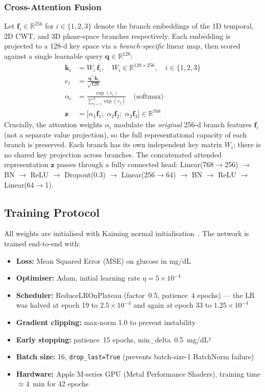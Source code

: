 \documentclass[conference]{IEEEtran}
\begin{document}
\subsubsection{Cross-Attention Fusion}
Let $\mathbf{f}_i \in \mathbb{R}^{256}$ for $i \in \{1,2,3\}$ denote the
branch embeddings of the 1D temporal, 2D CWT, and 3D phase-space branches
respectively.  Each embedding is projected to a 128-d key space via a
\emph{branch-specific} linear map, then scored against a single learnable
query $\mathbf{q} \in \mathbb{R}^{128}$:
\begin{align}
  \mathbf{k}_i &= W_i\, \mathbf{f}_i, \quad
  W_i \in \mathbb{R}^{128\times256}, \quad i \in \{1,2,3\} \label{eq:attn_key}\\
  e_i           &= \frac{\mathbf{q}^\top \mathbf{k}_i}{\sqrt{128}} \\
  \alpha_i       &= \frac{\exp(e_i)}{\sum_{j=1}^{3} \exp(e_j)}\quad\text{(softmax)} \\
  \mathbf{z}    &= \bigl[\alpha_1\mathbf{f}_1;\;
                          \alpha_2\mathbf{f}_2;\;
                          \alpha_3\mathbf{f}_3\bigr] \in \mathbb{R}^{768}
  \label{eq:attn}
\end{align}
Crucially, the attention weights $\alpha_i$ modulate the \emph{original}
256-d branch features $\mathbf{f}_i$ (not a separate value projection),
so the full representational capacity of each branch is preserved.  Each
branch has its own independent key matrix $W_i$; there is no shared key
projection across branches.
The concatenated attended representation $\mathbf{z}$ passes through a fully
connected head: Linear(768$\to$256) $\to$ BN $\to$ ReLU $\to$ Dropout(0.3)
$\to$ Linear(256$\to$64) $\to$ BN $\to$ ReLU $\to$ Linear(64$\to$1).

\subsection{Training Protocol}

All weights are initialised with Kaiming normal
initialisation~\cite{he2015init}.  The network is trained end-to-end with:
\begin{itemize}
  \item \textbf{Loss:} Mean Squared Error (MSE) on glucose in mg/dL
  \item \textbf{Optimiser:} Adam, initial learning rate $\eta=5\times10^{-4}$
  \item \textbf{Scheduler:} ReduceLROnPlateau (factor~0.5, patience~4 epochs)
        --- the LR was halved at epoch 19 to $2.5\times10^{-4}$ and again at
        epoch 33 to $1.25\times10^{-4}$
  \item \textbf{Gradient clipping:} max-norm 1.0 to prevent instability
  \item \textbf{Early stopping:} patience~15 epochs, min\_delta~0.5~mg/dL²
  \item \textbf{Batch size:} 16, \texttt{drop\_last=True} (prevents
        batch-size-1 BatchNorm failure)
  \item \textbf{Hardware:} Apple M-series GPU (Metal Performance Shaders),
        training time $\approx4$~min for 42 epochs
\end{itemize}
\end{document}

